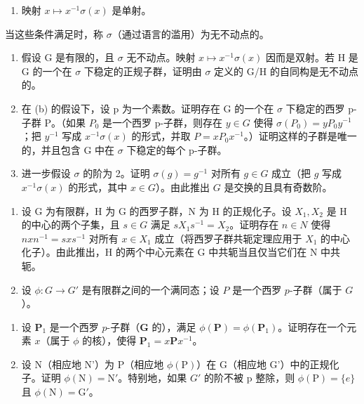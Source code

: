 \begin{enumerate}
\def\labelenumi{(\roman{enumi})}
\setcounter{enumi}{1}
\tightlist
\item
  映射 \(x \mapsto x^{-1}\sigma(x)\) 是单射。
\end{enumerate}

当这些条件满足时，称 \(\sigma\)（通过语言的滥用）为无不动点的。

\begin{enumerate}
\def\labelenumi{(\alph{enumi})}
\setcounter{enumi}{1}
\item
  假设 G 是有限的，且 \(\sigma\) 无不动点。映射 \(x \mapsto x^{-1}\sigma(x)\) 因而是双射。若 H 是 G 的一个在 \(\sigma\) 下稳定的正规子群，证明由 \(\sigma\) 定义的 G/H 的自同构是无不动点的。
\item
  在 (b) 的假设下，设 p 为一个素数。证明存在 G 的一个在 \(\sigma\) 下稳定的西罗 p-子群 P。（如果 \(P_{0}\) 是一个西罗 p-子群，则存在 \(y \in G\) 使得 \(\sigma(P_{0}) = yP_{0}y^{-1}\)；把 \(y^{-1}\) 写成 \(x^{-1}\sigma(x)\) 的形式，并取 \(P = xP_{0}x^{-1}\)。）证明这样的子群是唯一的，并且包含 G 中在 \(\sigma\) 下稳定的每个 p-子群。
\item
  进一步假设 \(\sigma\) 的阶为 2。证明 \(\sigma(g) = g^{-1}\) 对所有 \(g \in G\) 成立（把 \(g\) 写成 \(x^{-1}\sigma(x)\) 的形式，其中 \(x \in G\)）。由此推出 \(G\) 是交换的且具有奇数阶。
\end{enumerate}

\begin{enumerate}
\def\labelenumi{\arabic{enumi}。}
\setcounter{enumi}{23}
\item
  设 G 为有限群，H 为 G 的西罗子群，N 为 H 的正规化子。设 \(X_{1}, X_{2}\) 是 H 的中心的两个子集，且 \(s \in G\) 满足 \(sX_{1}s^{-1} = X_{2}\)。证明存在 \(n \in N\) 使得 \(nxn^{-1} = sxs^{-1}\) 对所有 \(x \in X_{1}\) 成立（将西罗子群共轭定理应用于 \(X_{1}\) 的中心化子）。由此推出，H 的两个中心元素在 G 中共轭当且仅当它们在 N 中共轭。
\item
  设 \(\phi: G \to G'\) 是有限群之间的一个满同态；设 \(P\) 是一个西罗 \(p\)-子群（属于 \(G\)）。
\end{enumerate}

\begin{enumerate}
\def\labelenumi{(\alph{enumi})}
\item
  设 \(\mathbf{P}_1\) 是一个西罗 \(p\)-子群（\(\mathbf{G}\) 的），满足 \(\phi(\mathbf{P}) = \phi(\mathbf{P}_1)\)。证明存在一个元素 \(x\)（属于 \(\phi\) 的核），使得 \(\mathbf{P}_1 = x\mathbf{P}x^{-1}\)。
\item
  设 N（相应地 N'）为 P（相应地 \(\phi(\mathrm{P})\)）在 G（相应地 G'）中的正规化子。证明 \(\phi(\mathrm{N}) = \mathrm{N}'\)。特别地，如果 \(G'\) 的阶不被 p 整除，则 \(\phi(\mathrm{P}) = \{e\}\) 且 \(\phi(\mathrm{N}) = \mathrm{G}'\)。
\end{enumerate}

